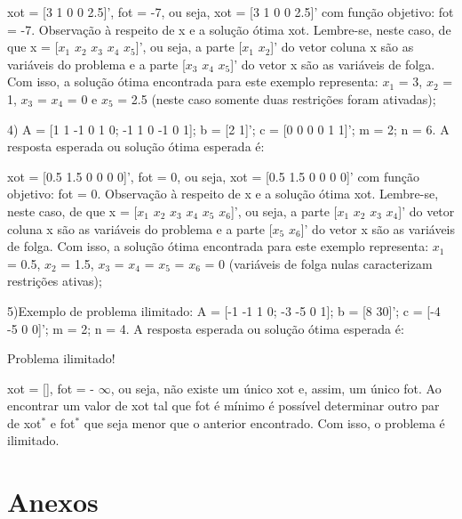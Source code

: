 \documentclass[10pt]{article}
\begin{document}
xot = [3 1 0 0 2.5]', fot = -7, ou seja, xot = [3 1 0 0 2.5]' com função objetivo: fot = -7.
\newline
Observação à respeito de x e a solução ótima xot. Lembre-se, neste caso, de que x = [$x_1$ $x_2$ $x_3$ $x_4$ $x_5$]', ou seja, a parte [$x_1$ $x_2$]' do vetor coluna x são as variáveis do problema e a parte [$x_3$ $x_4$ $x_5$]' do vetor x são as variáveis de folga. Com isso, a solução ótima encontrada para este exemplo representa: $x_1$ = 3, $x_2$ = 1, $x_3$ = $x_4$ = 0 e $x_5$ = 2.5 (neste caso somente duas restrições foram ativadas);
\newline

4) A = [1 1 -1 0 1 0; -1 1 0 -1 0 1]; b = [2 1]'; c = [0 0 0 0 1 1]'; m = 2; n = 6. A resposta esperada ou solução ótima esperada é:
\newline

xot = [0.5 1.5 0 0 0 0]', fot = 0, ou seja, xot = [0.5 1.5 0 0 0 0]' com função objetivo: fot = 0.
\newline
Observação à respeito de x e a solução ótima xot. Lembre-se, neste caso, de que x = [$x_1$ $x_2$ $x_3$ $x_4$ $x_5$ $x_6$]', ou seja, a parte [$x_1$ $x_2$ $x_3$ $x_4$]' do vetor coluna x são as variáveis do problema e a parte [$x_5$ $x_6$]' do vetor x são as variáveis de folga. Com isso, a solução ótima encontrada para este exemplo representa: $x_1$ = 0.5, $x_2$ = 1.5, $x_3$ = $x_4$ = $x_5$ = $x_6$ = 0 (variáveis de folga nulas caracterizam restrições ativas);
\newline

5)Exemplo de problema ilimitado: A = [-1 -1 1 0; -3 -5 0 1]; b = [8 30]'; c = [-4 -5 0 0]'; m = 2; n = 4. A resposta esperada ou solução ótima esperada é:
\newline

Problema ilimitado!
\newline

xot = [], fot = - $\infty$, ou seja, não existe um único xot e, assim, um único fot. Ao encontrar um valor de xot tal que fot é mínimo é possível determinar outro par de xot$^{*}$ e fot$^{*}$ que seja menor que o anterior encontrado. Com isso, o problema é ilimitado.

\section{Anexos}
\end{document}
